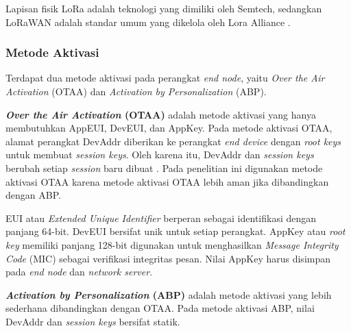 Lapisan fisik LoRa adalah teknologi yang dimiliki oleh Semtech, sedangkan LoRaWAN adalah standar umum yang dikelola oleh Lora Alliance \cite{Augustin2016}. 

\subsubsection{Metode Aktivasi}
Terdapat dua metode aktivasi pada perangkat \textit{end node}, yaitu \textit{Over the Air Activation} (OTAA) dan \textit{Activation by Personalization} (ABP).

\textbf{\textit{Over the Air Activation} (OTAA)} adalah metode aktivasi yang hanya membutuhkan AppEUI, DevEUI, dan AppKey. Pada metode aktivasi OTAA, alamat perangkat DevAddr diberikan ke perangkat \textit{end device} dengan \textit{root keys} untuk membuat \textit{session keys}. Oleh karena itu, DevAddr dan \textit{session keys} berubah setiap \textit{session} baru dibuat \cite{LoRa2017}. Pada penelitian ini digunakan metode aktivasi OTAA karena metode aktivasi OTAA lebih aman jika dibandingkan dengan ABP.

EUI atau \textit{Extended Unique Identifier} berperan sebagai identifikasi dengan panjang 64-bit. DevEUI bersifat unik untuk setiap perangkat. AppKey atau \textit{root key} memiliki panjang 128-bit digunakan untuk menghasilkan \textit{Message Integrity Code} (MIC) sebagai verifikasi integritas pesan. Nilai AppKey harus disimpan pada \textit{end node} dan \textit{network server}.

\textbf{\textit{Activation by Personalization} (ABP)} adalah metode aktivasi yang lebih sederhana dibandingkan dengan OTAA. Pada metode aktivasi ABP, nilai DevAddr dan \textit{session keys} bersifat statik.
\fi